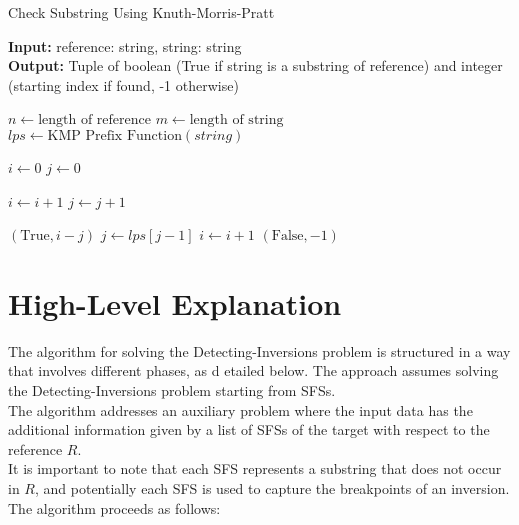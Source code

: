 \begin{algorithm}[H]
\caption{Check Substring Using Knuth-Morris-Pratt}
\hspace*{\algorithmicindent} \textbf{Input:} reference: string, string: string \\
\hspace*{\algorithmicindent} \textbf{Output:} Tuple of boolean (True if string is a substring of reference) and integer (starting index if found, -1 otherwise)

\begin{algorithmic}[1]
\STATE $n \gets \text{length of reference}$
\STATE $m \gets \text{length of string}$
\STATE $lps \gets \text{KMP Prefix Function}(string)$

\STATE $i \gets 0$ 
\STATE $j \gets 0$ 

        \STATE $i \gets i + 1$
        \STATE $j \gets j + 1$
    \ENDIF

        \RETURN $(\text{True}, i - j)$ 
            \STATE $j \gets lps[j - 1]$
        \ELSE
            \STATE $i \gets i + 1$
        \ENDIF
    \ENDIF
\ENDWHILE
\RETURN $(\text{False}, -1)$ 
\end{algorithmic}
\end{algorithm}

\newpage
\section{High-Level Explanation}

The algorithm for solving the Detecting-Inversions problem is structured in a way that involves different phases, as d
etailed below. The approach assumes solving the Detecting-Inversions problem starting from SFSs. \\
The algorithm addresses an auxiliary problem where the input data has the additional information given by a list of SFSs of the target with respect to the reference $R$.\\
It is important to note that each SFS represents a substring that does not occur in $R$, and potentially each SFS is used to capture the breakpoints of an inversion. The algorithm proceeds as follows:

